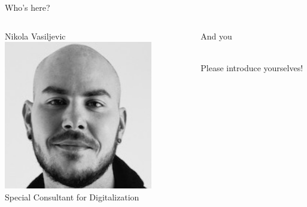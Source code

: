 \begin{frame}{Who's here?}
\begin{columns}[t]
    \begin{block}{Nikola Vasiljevic}
    \includegraphics[width=0.8\textwidth]{images/Vasiljevic_Headshot.png}\\
    Special Consultant for Digitalization \\
    \end{block}
    
    
    \begin{block}{And you}
    
    \centering
    {\fontsize{100}{120}\selectfont\faUsers}\\
    Please introduce yourselves!
    
    \end{block}
    
    \end{columns}


\end{frame}


